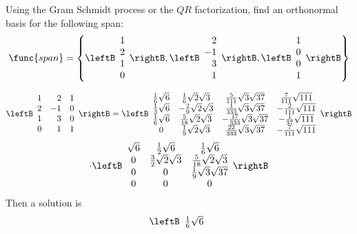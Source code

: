 \begin{enumialphparenastyle}
\begin{ex} Using the Gram Schmidt process or the $QR$ factorization, find an
orthonormal basis for the following span:
\[
\func{span} = \left\{
\leftB
\begin{array}{r}
1 \\
2 \\
1 \\
0
\end{array}
\rightB
, \leftB
\begin{array}{r}
2 \\
-1 \\
3 \\
1
\end{array}
\rightB , \leftB
\begin{array}{r}
1 \\
0 \\
0 \\
1
\end{array}
\rightB \right\}
\]
\begin{sol}
\[
\leftB
\begin{array}{rrr}
1 & 2 & 1 \\
2 & -1 & 0 \\
1 & 3 & 0 \\
0 & 1 & 1
\end{array}
\rightB =  \leftB
\begin{array}{cccc}
\frac{1}{6}\sqrt{6} & \frac{1}{6}\sqrt{2}\sqrt{3} & \frac{5}{111}\sqrt{3}
\sqrt{37} & \frac{7}{111}\sqrt{111} \\
\frac{1}{3}\sqrt{6} & -\frac{2}{9}\sqrt{2}\sqrt{3} & \frac{1}{333}\sqrt{3}
\sqrt{37} & -\frac{2}{111}\sqrt{111} \\
\frac{1}{6}\sqrt{6} & \frac{5}{18}\sqrt{2}\sqrt{3} & -\frac{17}{333}\sqrt{3}
\sqrt{37} & -\frac{1}{37}\sqrt{111} \\
0 & \frac{1}{9}\sqrt{2}\sqrt{3} & \frac{22}{333}\sqrt{3}\sqrt{37} & -\frac{7
}{111}\sqrt{111}
\end{array}
\rightB
\]
\[
\cdot \leftB
\begin{array}{ccc}
\sqrt{6} & \frac{1}{2}\sqrt{6} & \frac{1}{6}\sqrt{6} \\
0 & \frac{3}{2}\sqrt{2}\sqrt{3} & \frac{5}{18}\sqrt{2}\sqrt{3} \\
0 & 0 & \frac{1}{9}\sqrt{3}\sqrt{37} \\
0 & 0 & 0
\end{array}
\rightB
\]
Then a solution is
\[
\leftB
\begin{array}{c}
\frac{1}{6}\sqrt{6} \\

\end{array}\]
\end{sol}
\end{ex}
\end{enumialphparenastyle}

